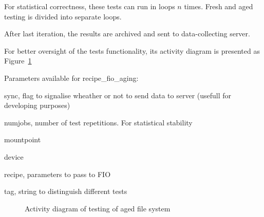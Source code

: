 \documentclass[
  color, %
  table, %
  lof,   %
  lot,   %
]{fithesis3}
\begin{document}
For statistical correctness, these tests can run in loops $n$ times. Fresh and aged testing is divided into separate loops.

After last iteration, the results are archived and sent to data-collecting server. 

For better oversight of the tests functionality, its activity diagram is presented as Figure~\ref{fig:rec_activity}

Parameters available for recipe\_fio\_aging:
\begin{compactenum}
  \item sync, flag to signalise wheather or not to send data to server (usefull for developing purposes)
  \item numjobs, number of test repetitions. For statistical stability
  \item mountpoint
  \item device
  \item recipe, parameters to pass to FIO
  \item tag, string to distinguish different tests
  \end{compactenum}

\begin{figure}[ht]
    \centering
    \caption{Activity diagram of testing of aged file system}
    \label{fig:rec_activity}
\end{figure}
\end{document}
